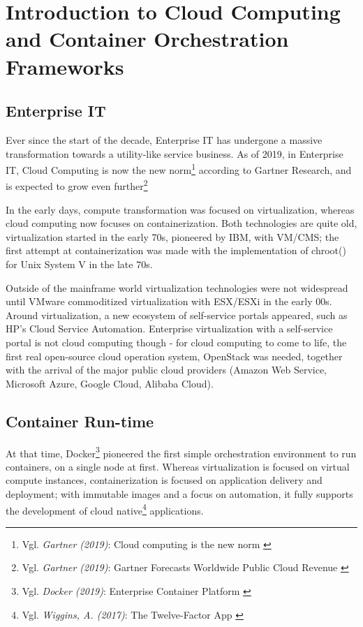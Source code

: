 %
%

\pagebreak
\section{Introduction to Cloud Computing and Container Orchestration Frameworks}

\onehalfspacing

\subsection{Enterprise IT}

Ever since the start of the decade, Enterprise IT has undergone a massive transformation towards a utility-like service business. As of 2019, in Enterprise IT, Cloud Computing is now the new norm\footnote{Vgl. \textit{Gartner (2019)}: Cloud computing is the new norm \cite{gartnerCloudStatement}} according to Gartner Research, and is expected to grow even further\footnote{Vgl. \textit{Gartner (2019)}: Gartner Forecasts Worldwide Public Cloud Revenue \cite{gartnerForecast}}

In the early days, compute transformation was focused on virtualization, whereas cloud computing now focuses on containerization. Both technologies are quite old, virtualization started in the early 70s, pioneered by IBM, with VM/CMS; the first attempt at containerization was made with the implementation of chroot() for Unix System V in the late 70s.

Outside of the mainframe world virtualization technologies were not widespread until VMware commoditized virtualization with ESX/ESXi in the early 00s. Around virtualization, a new ecosystem of self-service portals appeared, such as HP's Cloud Service Automation. Enterprise virtualization with a self-service portal is not cloud computing though - for cloud computing to come to life, the first real open-source cloud operation system, OpenStack was needed, together with the arrival of the major public cloud providers (Amazon Web Service, Microsoft Azure, Google Cloud, Alibaba Cloud).

\subsection{Container Run-time}

At that time, Docker\footnote{Vgl. \textit{Docker (2019)}: Enterprise Container Platform \cite{docker}} pioneered the first simple orchestration environment to run containers, on a single node at first. Whereas virtualization is focused on virtual compute instances, containerization is focused on application delivery and deployment; with immutable images and a focus on automation, it fully supports the development of cloud native\footnote{Vgl. \textit{Wiggins, A. (2017)}: The Twelve-Factor App \cite{12factor}} applications.

